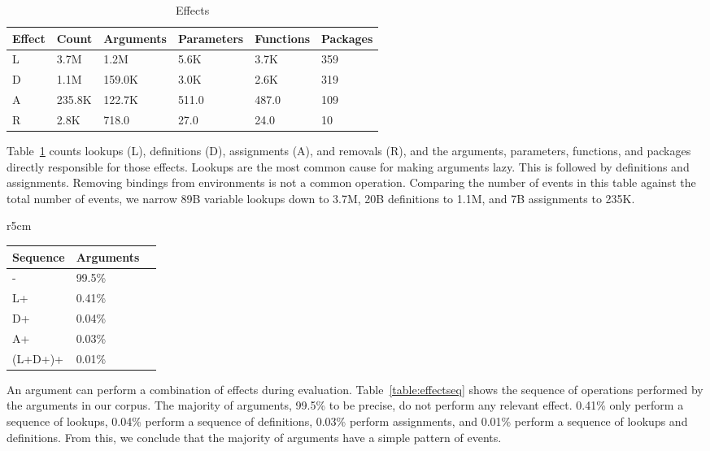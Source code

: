 \documentclass[review,creen,acmsmall]{acmart}
\begin{document}
\begin{table}[!h]  \vspace{-3mm}  \small
  \caption{Effects} \label{table:effects} \centering
  \begin{tabular}{llllll}    \toprule
    \textbf{Effect}&\textbf{Count}&\textbf{Arguments}&\textbf{Parameters}&\textbf{Functions}&\textbf{Packages}\\    \midrule
    L&3.7M&1.2M&5.6K&3.7K&359\\
    D&1.1M&159.0K&3.0K&2.6K&319\\
    A&235.8K&122.7K&511.0&487.0&109\\
    R&2.8K&718.0&27.0&24.0&10\\    \bottomrule
  \end{tabular}
\end{table}

\noindent
Table~\ref{table:effects} counts lookups (L), definitions (D), assignments (A),
and removals (R), and the arguments, parameters, functions, and packages directly
responsible for those effects. Lookups are the most common cause for making
arguments lazy. This is followed by definitions and assignments. Removing
bindings from environments is not a common operation.
%
Comparing the number of events in this table against the total number of events,
we narrow 89B variable lookups down to 3.7M, 20B definitions to 1.1M, and 7B
assignments to 235K.

\begin{wraptable}{r}{5cm}
  \vspace{-3mm}
  \small
  \caption{Effect Sequence} \label{table:effectseq}
  \centering
  \begin{tabular}{lll}
    \toprule
    \textbf{Sequence}&\textbf{Arguments}\\
    \midrule
    -&99.5\%\\
    L+&0.41\%\\
    D+&0.04\%\\
    A+&0.03\%\\
    (L+D+)+&0.01\%\\
    \bottomrule
  \end{tabular}
\end{wraptable}

An argument can perform a combination of effects during evaluation.
Table~\ref{table:effectseq} shows the sequence of operations performed by the
arguments in our corpus. The majority of arguments, 99.5\% to be precise, do not
perform any relevant effect. 0.41\% only perform a sequence of lookups, 0.04\%
perform a sequence of definitions, 0.03\% perform assignments, and 0.01\%
perform a sequence of lookups and definitions. From this, we conclude that
the majority of arguments have a simple pattern of events.
\end{document}
